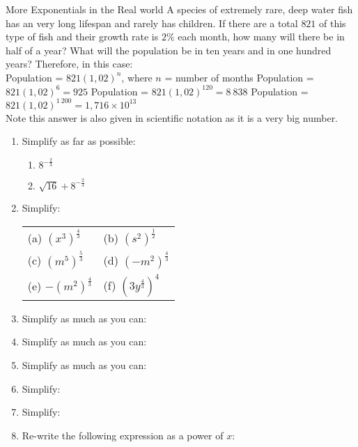 \begin{wex}{More Exponentials in the Real world} 
{A species of extremely rare, deep water fish has an very long lifespan and rarely has children. If there are a total $821$ of this type of fish and their growth rate is $2\%$ each month, how many will there be in half of a year? What will the population be in ten years and in one hundred years?}{
Therefore, in this case:\\
Population = $821(1,02)^n$,   where $n$ = number of months
Population = $821(1,02)^6 = 925$
Population = $821(1,02)^{120} = 8~838$
Population = $821(1,02)^{1~200} = 1,716 \times 10^{13}$\\
Note this answer is also given in scientific notation as it is a very big number.}
\end{wex}

\begin{eocexercises}{}
\begin{enumerate}
\item{Simplify as far as possible:
\begin{enumerate}
\item{$8^{-\frac{2}{3}}$}
\item{$\sqrt{16}+8^{-\frac{2}{3}}$}
\end{enumerate}}
\item{Simplify:
\begin{center}
\begin{tabular}{p{4cm}p{4cm}}
(a) $(x^3)^\frac{4}{3}$ & (b) $(s^2)^\frac{1}{2}$\\
(c) $(m^5)^\frac{5}{3}$& (d) $(-m^2)^\frac{4}{3}$\\
(e) $-(m^2)^\frac{4}{3}$&(f) $(3y^\frac{4}{3})^4$\\
\end{tabular}
\end{center}}

\item{Simplify as much as you can:
}

\item{Simplify as much as you can:
}

\item{Simplify as much as you can:
}
 \item{Simplify:
}

\item{Simplify:
}

\item{Re-write the following expression as a power of $x$:
}

\end{enumerate}



\end{eocexercises} 




